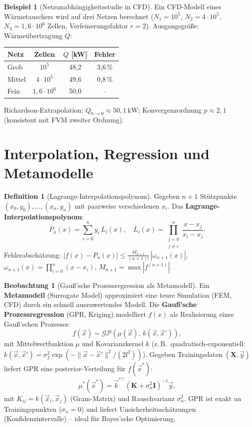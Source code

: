 ﻿\documentclass[a4paper,12pt]{report}
\theoremstyle{definition}
\newtheorem{definition}{Definition}
\newtheorem{beispiel}{Beispiel}
\newtheorem{beobachtung}{Beobachtung}
\begin{document}
\begin{beispiel}[Netzunabhängigkeitsstudie in CFD]
Ein CFD-Modell eines Wärmetauschers wird auf drei Netzen berechnet
($N_1 = 10^5$, $N_2 = 4\cdot10^5$, $N_3 = 1{,}6\cdot10^6$ Zellen,
Verfeinerungsfaktor $r = 2$). Ausgangsgröße: Wärmeübertragung $\dot{Q}$:
\begin{center}
\begin{tabular}{lccc}
\toprule
Netz & Zellen & $\dot{Q}$ [kW] & Fehler \\
\midrule
Grob & $10^5$ & 48{,}2 & 3{,}6\,\% \\
Mittel & $4\cdot10^5$ & 49{,}6 & 0{,}8\,\% \\
Fein & $1{,}6\cdot10^6$ & 50{,}0 & -- \\
\bottomrule
\end{tabular}
\end{center}
Richardson-Extrapolation: $\dot{Q}_{h\to0} \approx 50{,}1\,\mathrm{kW}$;
Konvergenzordnung $p \approx 2{,}1$ (konsistent mit FVM zweiter Ordnung).
\end{beispiel}

\section{Interpolation, Regression und Metamodelle}

\begin{definition}[Lagrange-Interpolationspolynom]
Gegeben $n+1$ Stützpunkte $(x_0,y_0),\ldots,(x_n,y_n)$ mit paarweise
verschiedenen $x_i$. Das \textbf{Lagrange-Interpolationspolynom}:
\[
  P_n(x) = \sum_{i=0}^n y_i\,L_i(x), \quad
  L_i(x) = \prod_{\substack{j=0\\j\neq i}}^n \frac{x-x_j}{x_i-x_j}.
\]
Fehlerabschätzung: $|f(x) - P_n(x)| \le \frac{M_{n+1}}{(n+1)!}\,|\omega_{n+1}(x)|$,
$\omega_{n+1}(x) = \prod_{i=0}^n(x-x_i)$, $M_{n+1} = \max|f^{(n+1)}|$.
\end{definition}

\begin{beobachtung}[Gauß'sche Prozessregression als Metamodell]
Ein \textbf{Metamodell} (Surrogate Model) approximiert eine teure
Simulation (FEM, CFD) durch ein schnell auszuwertendes Modell.
Die \textbf{Gauß'sche Prozessregression} (GPR, Kriging) modelliert
$f(x)$ als Realisierung eines Gauß'schen Prozesses:
\[
  f(\vec{x}) \sim \mathcal{GP}(\mu(\vec{x}),\, k(\vec{x},\vec{x}')),
\]
mit Mittelwertfunktion $\mu$ und Kovarianzkernel $k$ (z.\,B.\ quadratisch-exponentiell:
$k(\vec{x},\vec{x}') = \sigma_f^2\exp(-\|\vec{x}-\vec{x}'\|^2/(2l^2))$).
Gegeben Trainingsdaten $(\mathbf{X},\vec{y})$ liefert GPR eine
posterior-Verteilung für $f(\vec{x}^*)$:
\[
  \mu^*(\vec{x}^*) = \vec{k}^{*\top}(\mathbf{K}+\sigma_n^2\mathbf{I})^{-1}\vec{y},
\]
mit $K_{ij} = k(\vec{x}_i,\vec{x}_j)$ (Gram-Matrix) und
Rauschvarianz $\sigma_n^2$. GPR ist exakt an Trainingspunkten ($\sigma_n=0$)
und liefert Unsicherheitsschätzungen (Konfidenzintervalle) -- ideal für
Bayes'sche Optimierung.
\end{beobachtung}
\end{document}
